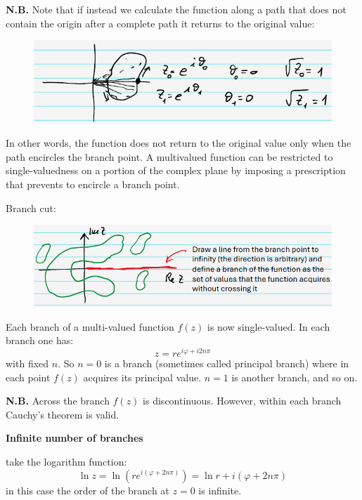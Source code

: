 \documentclass{article}
\begin{document}
\noindent
\textbf{N.B.} Note that if instead we calculate the function along a path that does not contain the origin after a complete path it returns to the original value:

\begin{figure}[h]
    \centering
    \includegraphics[width=0.5\linewidth]{fig21.png}
\end{figure}

\noindent
In other words, the function does not return to the original value only when the path encircles the branch point. A multivalued function can be restricted to single-valuedness on a portion of the complex plane by imposing a prescription that prevents to encircle a branch point.

\noindent
Branch cut:
\begin{figure}[h]
    \centering
    \includegraphics[width=0.7\linewidth]{fig22.png}
\end{figure}

\noindent
Each branch of a multi-valued function $f(z)$ is now single-valued. In each branch one has:
\begin{equation}
    z = re^{i \varphi + i 2n\pi}
\end{equation}
with fixed $n$. So $n=0$ is a branch (sometimes called principal branch) where in each point $f(z)$ acquires its principal value. $n=1$ is another branch, and so on.

\noindent
\textbf{N.B. }Across the branch $f(z)$ is discontinuous. However, within each branch Cauchy’s theorem is valid.

\newpage

\noindent
\textbf{Infinite number of branches}

\noindent
take the logarithm function:
\begin{equation}
    \ln z = \ln\left(r e^{i(\varphi + 2n\pi)}\right) = \ln r + i(\varphi + 2n\pi)
\end{equation}
in this case the order of the branch at $z=0$ is infinite.
\end{document}
